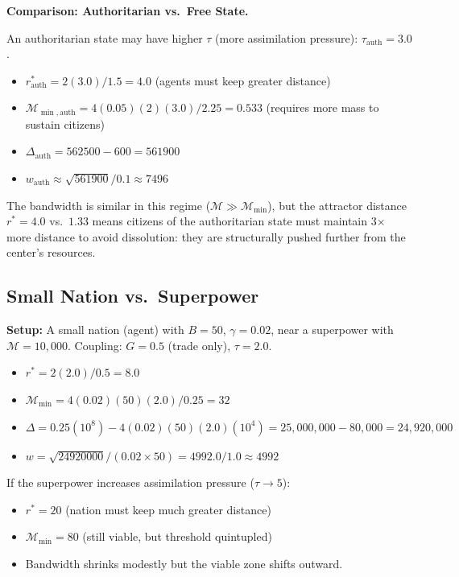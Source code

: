 \documentclass[11pt]{article}
\theoremstyle{plain}
\theoremstyle{definition}
\theoremstyle{remark}
\let\origsubsection\subsection
\renewcommand{\subsection}{\needspace{7\baselineskip}\origsubsection}
\providecommand{\tightlist}{%
  \setlength{\itemsep}{0pt}\setlength{\parskip}{0pt}}
\begin{document}
\textbf{Comparison: Authoritarian vs.~Free State.}

An authoritarian state may have higher \(\tau\) (more assimilation
pressure): \(\tau_{\text{auth}} = 3.0\).

\begin{itemize}
\tightlist
\item
  \(r^*_{\text{auth}} = 2(3.0)/1.5 = 4.0\) (agents must keep greater
  distance)
\item
  \(\mathcal{M}_{\min,\text{auth}} = 4(0.05)(2)(3.0)/2.25 = 0.533\)
  (requires more mass to sustain citizens)
\item
  \(\Delta_{\text{auth}} = 562500 - 600 = 561900\)
\item
  \(w_{\text{auth}} \approx \sqrt{561900}/0.1 \approx 7496\)
\end{itemize}

The bandwidth is similar in this regime
(\(\mathcal{M} \gg \mathcal{M}_{\min}\)), but the attractor distance
\(r^* = 4.0\) vs.~\(1.33\) means citizens of the authoritarian state
must maintain 3× more distance to avoid dissolution: they are
structurally pushed further from the center's resources.

\subsection{Small Nation
vs.~Superpower}\label{small-nation-vs.-superpower}

\textbf{Setup:} A small nation (agent) with \(B = 50\),
\(\gamma = 0.02\), near a superpower with \(\mathcal{M} = 10{,}000\).
Coupling: \(G = 0.5\) (trade only), \(\tau = 2.0\).

\begin{itemize}
\tightlist
\item
  \(r^* = 2(2.0)/0.5 = 8.0\)
\item
  \(\mathcal{M}_{\min} = 4(0.02)(50)(2.0)/0.25 = 32\)
\item
  \(\Delta = 0.25(10^8) - 4(0.02)(50)(2.0)(10^4) = 25{,}000{,}000 - 80{,}000 = 24{,}920{,}000\)
\item
  \(w = \sqrt{24920000}/(0.02 \times 50) = 4992.0/1.0 \approx 4992\)
\end{itemize}

If the superpower increases assimilation pressure (\(\tau \to 5\)):

\begin{itemize}
\tightlist
\item
  \(r^* = 20\) (nation must keep much greater distance)
\item
  \(\mathcal{M}_{\min} = 80\) (still viable, but threshold quintupled)
\item
  Bandwidth shrinks modestly but the viable zone shifts outward.
\end{itemize}
\end{document}
